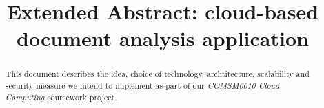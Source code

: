 \documentclass[conference]{IEEEtran}
\begin{document}
\title{Extended Abstract: cloud-based document analysis application}

\author{
\and
{}
}

\maketitle

\begin{abstract}
This document describes the idea, choice of technology, archtitecture, scalability and security measure
we intend to implement as part of our \textit{COMSM0010 Cloud Computing} coursework project.
\end{abstract}
\end{document}
